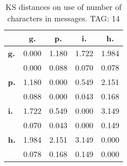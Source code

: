 \begin{table}[h!]
\begin{center}
\begin{tabular}{| l || c | c | c | c |}\hline
 & {\bf g.} & {\bf p.} & {\bf i.} & {\bf h.} \\\hline\hline
{\bf g.} & 0.000 & 1.180 & 1.722 & 1.984 \\
{\bf } & 0.000 & 0.088 & 0.070 & 0.078 \\\hline
{\bf p.} & 1.180 & 0.000 & 0.549 & 2.151 \\
{\bf } & 0.088 & 0.000 & 0.043 & 0.168 \\\hline
{\bf i.} & 1.722 & 0.549 & 0.000 & 3.149 \\
{\bf } & 0.070 & 0.043 & 0.000 & 0.149 \\\hline
{\bf h.} & 1.984 & 2.151 & 3.149 & 0.000 \\
{\bf } & 0.078 & 0.168 & 0.149 & 0.000 \\\hline
\end{tabular}
\caption{KS distances on use of number of characters in messages. TAG: 14}
\end{center}
\end{table}